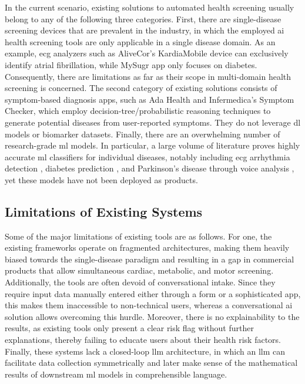 In the current scenario, existing solutions to automated health screening usually belong to any of the following three categories. First, there are single-disease screening devices that are prevalent in the industry, in which the employed \ac{ai} health screening tools are only applicable in a single disease domain. As an example, \ac{ecg} analyzers such as AliveCor's KardiaMobile device can exclusively identify atrial fibrillation, while MySugr app only focuses on diabetes. Consequently, there are limitations as far as their scope in multi-domain health screening is concerned. The second category of existing solutions consists of symptom-based diagnosis apps, such as Ada Health and Infermedica's Symptom Checker, which employ decision-tree/probabilistic reasoning techniques to generate potential diseases from user-reported symptoms. They do not leverage \ac{dl} models or biomarker datasets. Finally, there are an overwhelming number of research-grade \ac{ml} models. In particular, a large volume of literature proves highly accurate \ac{ml} classifiers for individual diseases, notably including \ac{ecg} arrhythmia detection \cite{guhdar2024}, diabetes prediction \cite{daza2024}, and Parkinson's disease through voice analysis \cite{islam2024}, yet these models have not been deployed as products.

\subsection{Limitations of Existing Systems}

Some of the major limitations of existing tools are as follows. For one, the existing frameworks operate on fragmented architectures, making them heavily biased towards the single-disease paradigm and resulting in a gap in commercial products that allow simultaneous cardiac, metabolic, and motor screening. Additionally, the tools are often devoid of conversational intake. Since they require input data manually entered either through a form or a sophisticated app, this makes them inaccessible to non-technical users, whereas a conversational \ac{ai} solution allows overcoming this hurdle. Moreover, there is no explainability to the results, as existing tools only present a clear risk flag without further explanations, thereby failing to educate users about their health risk factors. Finally, these systems lack a closed-loop \ac{llm} architecture, in which an \ac{llm} can facilitate data collection symmetrically and later make sense of the mathematical results of downstream \ac{ml} models in comprehensible language.

